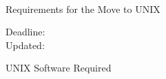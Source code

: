 \renewcommand{\starsitetelephone}{0703 592112}
\renewcommand{\starsitefax}{0703 585813}

\begin{center}
{\Large\sc \starsitename \\ [2ex]
           Requirements for the Move to UNIX}

\vspace{3mm}
{\large\sc Deadline: \starunixdate \\ [1ex]
           Updated: \starupdate}
\end{center}
\vspace{5mm}



%

\vspace{5mm}
\begin{center}
{\large\sc UNIX Software Required}
\end{center}


